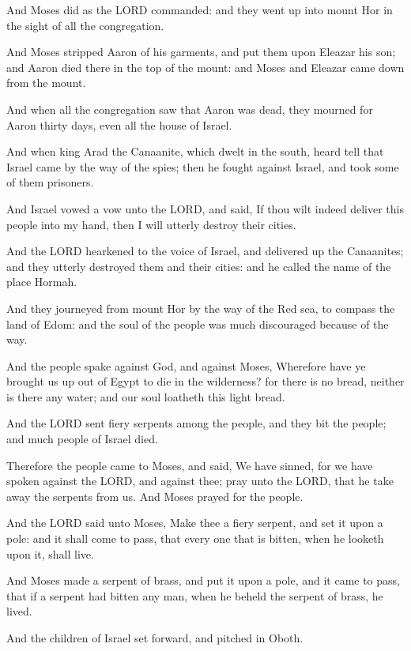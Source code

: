 \Verse And Moses did as the LORD commanded: and they went up into mount
Hor in the sight of all the congregation.

\Verse And Moses stripped Aaron of his garments, and put them upon
Eleazar his son; and Aaron died there in the top of the mount: and
Moses and Eleazar came down from the mount.

\Verse And when all the congregation saw that Aaron was dead, they
mourned for Aaron thirty days, even all the house of Israel.


\Chapter
\Verse And when king Arad the Canaanite, which dwelt in the south, heard
tell that Israel came by the way of the spies; then he fought against
Israel, and took some of them prisoners.

\Verse And Israel vowed a vow unto the LORD, and said, If thou wilt
indeed deliver this people into my hand, then I will utterly destroy
their cities.

\Verse And the LORD hearkened to the voice of Israel, and delivered up
the Canaanites; and they utterly destroyed them and their cities: and
he called the name of the place Hormah.

\Verse And they journeyed from mount Hor by the way of the Red sea, to
compass the land of Edom: and the soul of the people was much
discouraged because of the way.

\Verse And the people spake against God, and against Moses, Wherefore
have ye brought us up out of Egypt to die in the wilderness? for there
is no bread, neither is there any water; and our soul loatheth this
light bread.

\Verse And the LORD sent fiery serpents among the people, and they bit
the people; and much people of Israel died.

\Verse Therefore the people came to Moses, and said, We have sinned, for
we have spoken against the LORD, and against thee; pray unto the LORD,
that he take away the serpents from us. And Moses prayed for the
people.

\Verse And the LORD said unto Moses, Make thee a fiery serpent, and set
it upon a pole: and it shall come to pass, that every one that is
bitten, when he looketh upon it, shall live.

\Verse And Moses made a serpent of brass, and put it upon a pole, and it
came to pass, that if a serpent had bitten any man, when he beheld the
serpent of brass, he lived.

\Verse And the children of Israel set forward, and pitched in Oboth.

